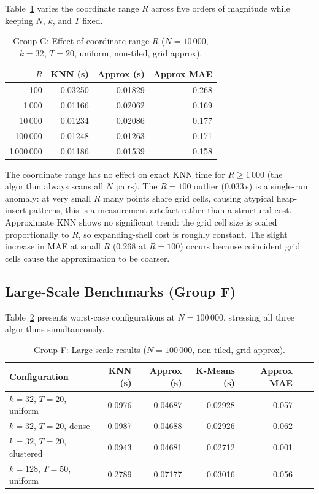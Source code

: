\documentclass[11pt,a4paper]{article}
\begin{document}
Table~\ref{tab:vary_range} varies the coordinate range $R$ across five
orders of magnitude while keeping $N$, $k$, and $T$ fixed.

\begin{table}[H]
\centering
\caption{Group G: Effect of coordinate range $R$ ($N=10\,000$, $k=32$,
$T=20$, uniform, non-tiled, grid approx).}
\label{tab:vary_range}
\begin{tabular}{rrrr}
\toprule
$R$ & KNN (s) & Approx (s) & Approx MAE \\
\midrule
100         & 0.03250 & 0.01829 & 0.268 \\
1\,000      & 0.01166 & 0.02062 & 0.169 \\
10\,000     & 0.01234 & 0.02086 & 0.177 \\
100\,000    & 0.01248 & 0.01263 & 0.171 \\
1\,000\,000 & 0.01186 & 0.01539 & 0.158 \\
\bottomrule
\end{tabular}
\end{table}

The coordinate range has no effect on exact KNN time for $R \ge 1\,000$ (the
algorithm always scans all $N$ pairs).  The $R=100$ outlier ($0.033$\,s) is a
single-run anomaly: at very small $R$ many points share grid cells, causing
atypical heap-insert patterns; this is a measurement artefact rather than a
structural cost.  Approximate KNN shows no significant trend: the grid cell
size is scaled proportionally to $R$, so expanding-shell cost is roughly
constant.  The slight increase in MAE at small $R$ ($0.268$ at $R=100$) occurs
because coincident grid cells cause the approximation to be coarser.

\subsection{Large-Scale Benchmarks (Group F)}

Table~\ref{tab:large} presents worst-case configurations at $N=100\,000$,
stressing all three algorithms simultaneously.

\begin{table}[H]
\centering
\caption{Group F: Large-scale results ($N=100\,000$, non-tiled, grid approx).}
\label{tab:large}
\begin{tabular}{lrrrrrr}
\toprule
Configuration & KNN (s) & Approx (s) & K-Means (s) & Approx MAE \\
\midrule
$k=32$, $T=20$, uniform   & 0.0976 & 0.04687 & 0.02928 & 0.057 \\
$k=32$, $T=20$, dense     & 0.0987 & 0.04688 & 0.02926 & 0.062 \\
$k=32$, $T=20$, clustered & 0.0943 & 0.04681 & 0.02712 & 0.001 \\
$k=128$, $T=50$, uniform  & 0.2789 & 0.07177 & 0.03016 & 0.056 \\
\bottomrule
\end{tabular}
\end{table}
\end{document}
